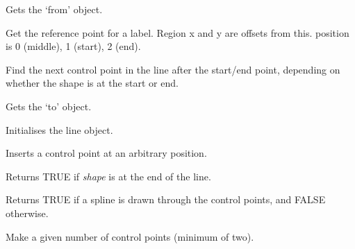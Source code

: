 
Gets the `from' object.



Get the reference point for a label. Region x and y are offsets from this.
position is 0 (middle), 1 (start), 2 (end).



Find the next control point in the line after the start/end point,
depending on whether the shape is at the start or end.



Gets the `to' object.



Initialises the line object.



Inserts a control point at an arbitrary position.



Returns TRUE if {\it shape} is at the end of the line.



Returns TRUE if a spline is drawn through the control points, and FALSE otherwise.

\label{wxlineshapemakelinecontrolpoints}


Make a given number of control points (minimum of two).



